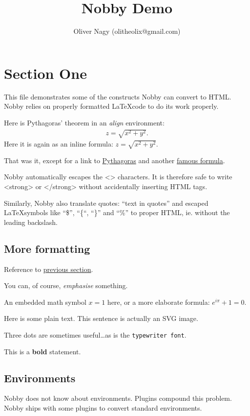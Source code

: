 \documentclass[10pt]{article}
\title{Nobby Demo}
\author{Oliver Nagy (olitheolix@gmail.com)}
\begin{document}
\maketitle

\section{Section One}
\label{sec:one}
This file demonstrates some of the constructs Nobby can convert to
HTML. Nobby relies on properly formatted \LaTeX code to do its work
properly.

Here is Pythagoras' theorem in an \emph{align} environment:
\begin{align*}
  \label{eq:pyth}
  z = \sqrt{x^2 + y^2}.
\end{align*}
Here it is again as an inline formula: $z = \sqrt{x^2 + y^2}$.

That was it, except for a link to \hyperref[eq:pyth]{Pythagoras} and
another \hyperref[eq:rel]{famous formula}.

Nobby automatically escapes the <> characters. It is therefore safe to
write <strong> or </strong> without accidentally inserting HTML tags.

Similarly, Nobby also translate quotes: ``text in quotes'' and
escaped \LaTeX symbols like ``\$'', ``\{``, ``\}'' and ``\%'' to
proper HTML, ie. without the leading backslash.

\subsection{More formatting}
Reference to \hyperref[sec:one]{previous section}.

You can, of course, \emph{emphasise} something.

An embedded math symbol $x=1$ here, or a more elaborate formula:
$e^{i\pi} + 1 = 0$.

Here is some plain text. {{This sentence is actually an SVG image.}}

Three dots are sometimes useful\ldots as is the \texttt{typewriter
  font}.

This is a \textbf{bold} statement.

\subsection{Environments}
Nobby does not know about environments. Plugins compound this
problem. Nobby ships with some plugins to convert standard
environments.
\end{document}
